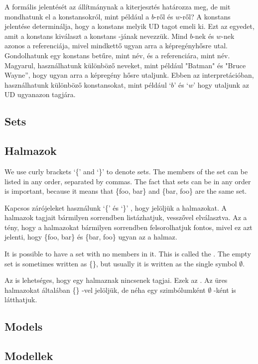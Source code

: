 A formális jelentését az állítmánynak a kiterjesztés határozza meg, de mit mondhatunk el a konstansokról, mint például a $b$-ről és $w$-ről? A konstans jelentése determinálja, hogy a konstans melyik UD tagot emeli ki. Ezt az egyedet, amit a konstans kiválaszt a konstans  -jának nevezzük. Mind $b$-nek és $w$-nek azonos a referenciája, mivel mindkettő ugyan arra a képregényhősre utal. Gondolhatunk egy konstans betűre, mint név, és a referenciára, mint név. Magyarul, használhatunk különböző neveket, mint például "Batman" és "Bruce Wayne”, hogy ugyan arra a képregény hősre utaljunk. Ebben az interpretációban, használhatunk különböző konstansokat, mint például `$b$' és `$w$' hogy utaljunk az UD ugyanazon tagjára.

\subsection{Sets}

\subsection{Halmazok}

We use curly brackets `\{' and `\}' to denote sets. The members of the set can be listed in any order, separated by commas. The fact that sets can be in any order is important, because it means that \{foo, bar\} and \{bar, foo\} are the same set.

Kapcsos zárójeleket használunk `\{' és `\}' , hogy jelöljük a halmazokat. A halmazok tagjait bármilyen sorrendben listázhatjuk, vesszővel elválasztva. Az a tény, hogy a halmazokat bármilyen sorrendben felsorolhatjuk fontos, mivel ez azt jelenti, hogy \{foo, bar\} és \{bar, foo\} ugyan az a halmaz.

It is possible to have a set with no members in it. This is called the . The empty set is sometimes written as \{\}, but usually it is written as the single symbol $\emptyset$.

Az is lehetséges, hogy egy halmaznak nincsenek tagjai. Ezek az . Az üres halmazokat általában \{\} -vel jelöljük, de néha egy szimbólumként $\emptyset$ -ként is látthatjuk.

\subsection{Models}

\subsection{Modellek}

